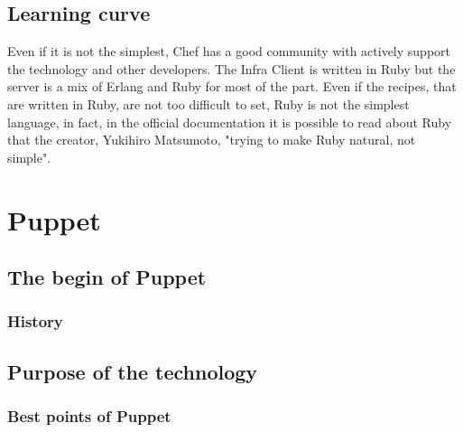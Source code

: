 \documentclass[12pt,a4paper,openright,twoside]{book}
\begin{document}
\section{Learning curve}
Even if it is not the simplest, Chef has a good community with actively support the technology and other developers.
The Infra Client is written in Ruby but the server is a mix of Erlang and Ruby for most of the part.
Even if the recipes, that are written in Ruby, are not too difficult to set, Ruby is not the simplest language, in fact, in the official documentation it is possible to read about Ruby that the creator, Yukihiro Matsumoto,
"trying to make Ruby natural, not simple"\cite{rubyDoc}.




\chapter{Puppet}

\section{The begin of Puppet}

\subsection{History}

\section{Purpose of the technology}

\subsection{Best points of Puppet}
\end{document}
